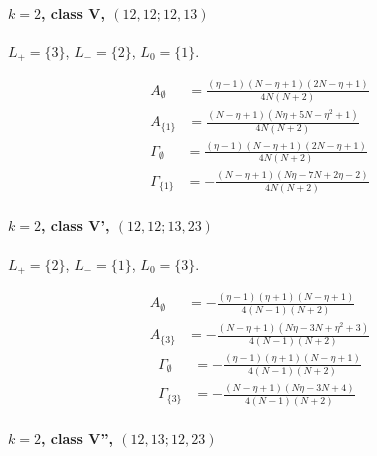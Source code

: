 \documentclass[11pt]{article}
\begin{document}
\paragraph{$k=2$, class V, $(12,12;12,13)$}

$L_+=\{3\}$, $L_-=\{2\}$, $L_0=\{1\}$.

\begin{align*}
  A_{\emptyset} &= \frac{\left(\eta - 1\right) \left(N - \eta + 1\right) \left(2 N - \eta + 1\right)}{4 N \left(N + 2\right)} \\
  A_{\{1\}} &= \frac{\left(N - \eta + 1\right) \left(N \eta + 5 N - \eta^{2} + 1\right)}{4 N \left(N + 2\right)} 
\end{align*}
\begin{align*}
  \Gamma_{\emptyset} &= \frac{\left(\eta - 1\right) \left(N - \eta + 1\right) \left(2 N - \eta + 1\right)}{4 N \left(N + 2\right)} \\
  \Gamma_{\{1\}} &= - \frac{\left(N - \eta + 1\right) \left(N \eta - 7 N + 2 \eta - 2\right)}{4 N \left(N + 2\right)} 
\end{align*}

\paragraph{$k=2$, class V', $(12,12;13,23)$}

$L_+=\{2\}$, $L_-=\{1\}$, $L_0=\{3\}$.

\begin{align*}
  A_{\emptyset} &= - \frac{\left(\eta - 1\right) \left(\eta + 1\right) \left(N - \eta + 1\right)}{4 \left(N - 1\right) \left(N + 2\right)} \\
  A_{\{3\}} &= - \frac{\left(N - \eta + 1\right) \left(N \eta - 3 N + \eta^{2} + 3\right)}{4 \left(N - 1\right) \left(N + 2\right)} 
\end{align*}
\begin{align*}
  \Gamma_{\emptyset} &= - \frac{\left(\eta - 1\right) \left(\eta + 1\right) \left(N - \eta + 1\right)}{4 \left(N - 1\right) \left(N + 2\right)} \\
  \Gamma_{\{3\}} &= - \frac{\left(N - \eta + 1\right) \left(N \eta - 3 N + 4\right)}{4 \left(N - 1\right) \left(N + 2\right)} 
\end{align*}

\paragraph{$k=2$, class V'', $(12,13;12,23)$}
\end{document}
